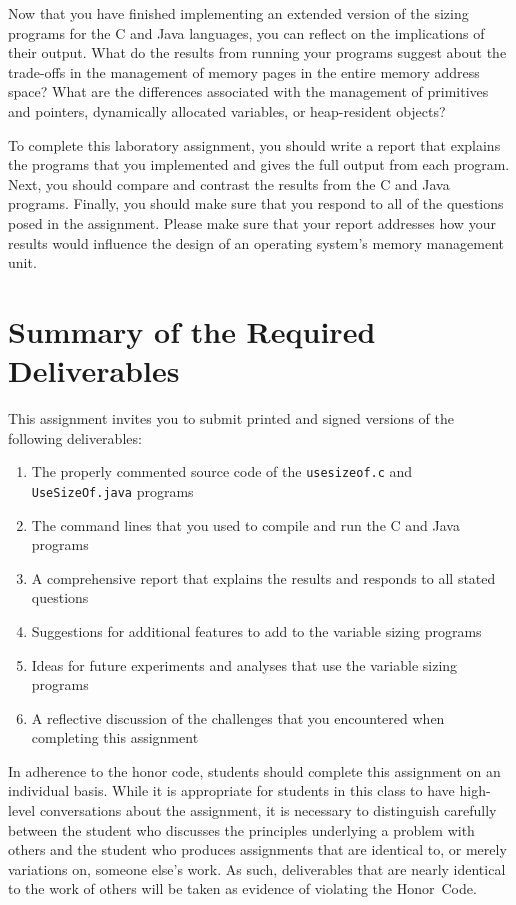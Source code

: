   Now that you have finished implementing an extended version of the sizing programs for the C and Java languages, you
  can reflect on the implications of their output. What do the results from running your programs suggest about the
  trade-offs in the management of memory pages in the entire memory address space? What are the differences associated
  with the management of primitives and pointers, dynamically allocated variables, or heap-resident objects? 
  
  To complete this laboratory assignment, you should write a report that explains the programs that you implemented and
  gives the full output from each program.  Next, you should compare and contrast the results from the C and Java
  programs.  Finally, you should make sure that you respond to all of the questions posed in the assignment. Please make
  sure that your report addresses how your results would influence the design of an operating system's memory
  management unit. 

\section*{Summary of the Required Deliverables}

This assignment invites you to submit printed and signed versions of the following deliverables: 

\begin{enumerate}

  \item The properly commented source code of the {\tt usesizeof.c} and {\tt UseSizeOf.java} programs

  \item The command lines that you used to compile and run the C and Java programs

  \item A comprehensive report that explains the results and responds to all stated questions 

  \item Suggestions for additional features to add to the variable sizing programs

  \item Ideas for future experiments and analyses that use the variable sizing programs

  \item A reflective discussion of the challenges that you encountered when completing this assignment

\end{enumerate}

In adherence to the honor code, students should complete this assignment on an individual basis. While it is appropriate
for students in this class to have high-level conversations about the assignment, it is necessary to distinguish
carefully between the student who discusses the principles underlying a problem with others and the student who produces
assignments that are identical to, or merely variations on, someone else's work.  As such, deliverables that are nearly
identical to the work of others will be taken as evidence of violating the \mbox{Honor Code}.  

  
